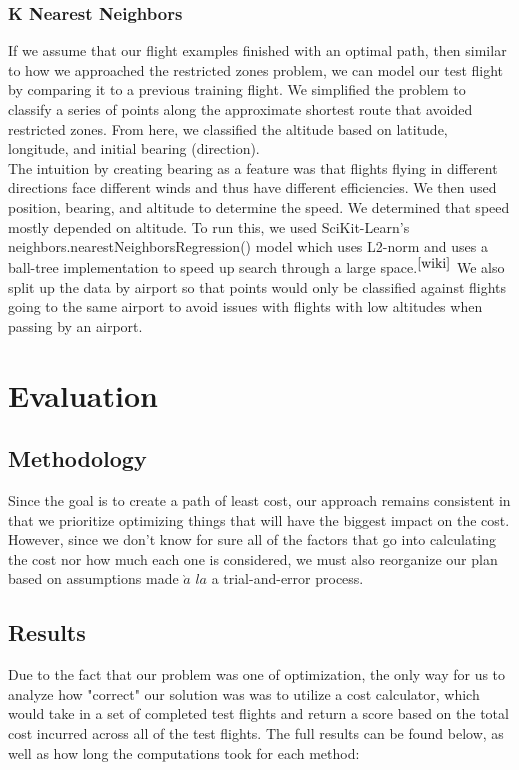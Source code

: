 \documentclass{article}[12pt]
\begin{document}
\begin{multicols}{2}
\subsubsection{K Nearest Neighbors}

If we assume that our flight examples finished with an optimal path, then similar to how we approached the restricted zones problem, we can model our test flight by comparing it to a previous training flight. We simplified the problem to classify a series of points along the approximate shortest route that avoided restricted zones. From here, we classified the altitude based on latitude, longitude, and initial bearing (direction).\\

The intuition by creating bearing as a feature was that flights flying in different directions face different winds and thus have different efficiencies. We then used position, bearing, and altitude to determine the speed. We determined that speed mostly depended on altitude. To run this, we used SciKit-Learn's neighbors.nearestNeighborsRegression() model which uses L2-norm and uses a ball-tree implementation to speed up search through a large space.$^{\cite{wiki}}$ We also split up the data by airport so that points would only be classified against flights going to the same airport to avoid issues with flights with low altitudes when passing by an airport.

\section{Evaluation}
\subsection{Methodology}
Since the goal is to create a path of least cost, our approach remains consistent in that we prioritize optimizing things that will have the biggest impact on the cost. However, since we don't know for sure all of the factors that go into calculating the cost nor how much each one is considered, we must also reorganize our plan based on assumptions made $\grave{a}$ $la$ a trial-and-error process.

\subsection{Results}
Due to the fact that our problem was one of optimization, the only way for us to analyze how "correct" our solution was was to utilize a cost calculator, which would take in a set of completed test flights and return a score based on the total cost incurred across all of the test flights. The full results can be found below, as well as how long the computations took for each method: \\


\end{multicols}
\end{document}
